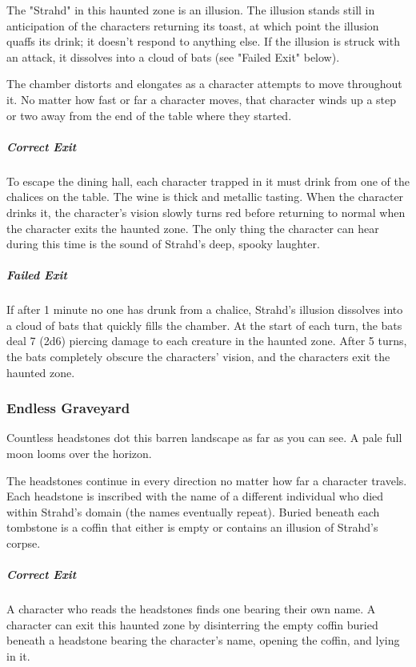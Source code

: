 \documentclass[10pt,a4paper,twoside,bg=print,twocolumn,openany,nodeprecatedcode]{dndbook}
\begin{document}
The "Strahd" in this haunted zone is an illusion. The illusion stands still in anticipation of the characters returning its toast, at which point the illusion quaffs its drink; it doesn't respond to anything else. If the illusion is struck with an attack, it dissolves into a cloud of bats (see "Failed Exit" below).

The chamber distorts and elongates as a character attempts to move throughout it. No matter how fast or far a character moves, that character winds up a step or two away from the end of the table where they started.

\subparagraph{Correct Exit}
To escape the dining hall, each character trapped in it must drink from one of the chalices on the table. The wine is thick and metallic tasting. When the character drinks it, the character's vision slowly turns red before returning to normal when the character exits the haunted zone. The only thing the character can hear during this time is the sound of Strahd's deep, spooky laughter.

\subparagraph{Failed Exit}
If after 1 minute no one has drunk from a chalice, Strahd's illusion dissolves into a cloud of bats that quickly fills the chamber. At the start of each turn, the bats deal 7 (2d6) piercing damage to each creature in the haunted zone. After 5 turns, the bats completely obscure the characters' vision, and the characters exit the haunted zone.

\subsubsection{Endless Graveyard}
\begin{DndReadAloud}{}
Countless headstones dot this barren landscape as far as you can see. A pale full moon looms over the horizon.

\end{DndReadAloud}

The headstones continue in every direction no matter how far a character travels. Each headstone is inscribed with the name of a different individual who died within Strahd's domain (the names eventually repeat). Buried beneath each tombstone is a coffin that either is empty or contains an illusion of Strahd's corpse.

\subparagraph{Correct Exit}
A character who reads the headstones finds one bearing their own name. A character can exit this haunted zone by disinterring the empty coffin buried beneath a headstone bearing the character's name, opening the coffin, and lying in it.
\end{document}
